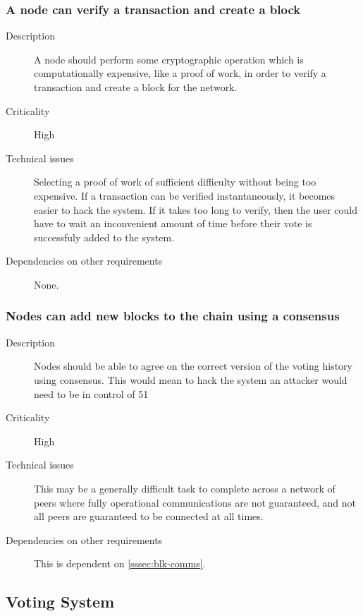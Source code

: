 \documentclass[a4paper,12pt]{article}
\begin{document}
\subsubsection{A node can verify a transaction and create a block}
\begin{description}
	\item[Description]
		A node should perform some cryptographic operation which is computationally expensive, like a proof of work, in order to verify a transaction and create a block for the network.
	\item[Criticality]
		High
	\item[Technical issues]
		Selecting a proof of work of sufficient difficulty without being too expensive. If a transaction can be verified instantaneously, it becomes easier to hack the system. If it takes too long to verify, then the user could have to wait an inconvenient amount of time before their vote is successfuly added to the system.
	\item[Dependencies on other requirements]
		None.
\end{description}

\subsubsection{Nodes can add new blocks to the chain using a consensus}
\begin{description}
	\item[Description]
		Nodes should be able to agree on the correct version of the voting history using consensus. This would mean to hack the system an attacker would need to be in control of 51%
	\item[Criticality]
		High
	\item[Technical issues]
		This may be a generally difficult task to complete across a network of peers where fully operational communications are not guaranteed, and not all peers are guaranteed to be connected at all times.
	\item[Dependencies on other requirements]
		This is dependent on \ref{sssec:blk-comms}.
\end{description}

\subsection{Voting System}
\end{document}
